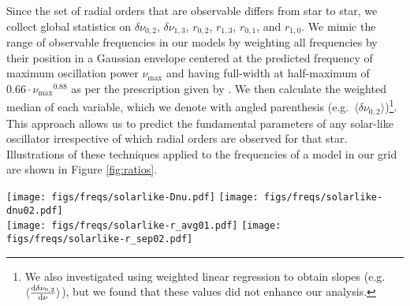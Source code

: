 \documentclass[manuscript]{aastex}
\begin{document}
Since the set of radial orders that are observable differs from star to star, we collect global statistics on $\delta\nu_{0,2}$, $\delta\nu_{1,3}$, $r_{0,2}$, $r_{1,3}$, $r_{0,1}$, and $r_{1,0}$. %
We mimic the range of observable frequencies in our models by weighting all frequencies by their position in a Gaussian envelope centered at the predicted frequency of maximum oscillation power $\nu_{\max}$ and having full-width at half-maximum of $0.66\cdot\nu_{\max}{}^{0.88}$ as per the prescription given by \citet{2012A&A...537A..30M}. We then calculate the weighted median of each variable, which we denote with angled parenthesis (e.g.~$\langle\delta\nu_{0,2}\rangle$)\footnote{We also investigated using weighted linear regression to obtain slopes (e.g.~$\langle\dv{\delta\nu_{0,2}}{\nu}\rangle$), but we found that these values did not enhance our analysis.}. This approach allows us to predict the fundamental parameters of any solar-like oscillator irrespective of which radial orders are observed for that star. Illustrations of these techniques applied to the frequencies of a model in our grid are shown in Figure \ref{fig:ratios}. 

\begin{figure*}
    \centering
    \texttt{[image: figs/freqs/solarlike-Dnu.pdf]}\hfill
    \texttt{[image: figs/freqs/solarlike-dnu02.pdf]}\\
    \texttt{[image: figs/freqs/solarlike-r\_avg01.pdf]}\hfill
    \texttt{[image: figs/freqs/solarlike-r\_sep02.pdf]}%
    \caption{The large and small frequency separations ($\Delta\nu$ and $\delta\nu_{0,2}$, top) and frequency ratios ($r_{0,1}$ and $r_{0,2}$, bottom) of a model in our grid. The vertical dotted line indicates $\nu_{\max}$. A $\nu_{\max}$-weighted linear fit is indicated with a dashed diagonal line to guide the eye. Point sizes and colors are proportional to the applied weighting, with blue points having a large influence and red points having little. \textbf{todo: find example with less whitespace?}}%
    \label{fig:ratios}
\end{figure*}
\end{document}
